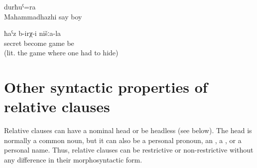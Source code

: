 \begin{exe}
	\ex	\label{ex:the boy called Mahammadhazhi}
	\gll	[Maħaˁmmadħaˁži	b-ik'ʷ-an]	durħuˁ=ra\\
		Mahammadhazhi	say	boy\\
	\glt	{}

	\ex	\label{ex:There was this game of ours, the hide-and-seek}
		ħaˁz	b-irχ-i	nišːa-la\\
		secret	become	game	be	\\
	\glt	{} (lit. the game where one had to hide)
\end{exe}



\section{Other syntactic properties of relative clauses}
\label{sec:Other syntactic properties of relative clauses}

Relative clauses can have a nominal head or be headless (see  below). The head is normally a common noun, but it can also be a personal pronoun, an , a , or a personal name. Thus, relative clauses can be restrictive or non-restrictive without any difference in their morphosyntactic form.\pagebreak

